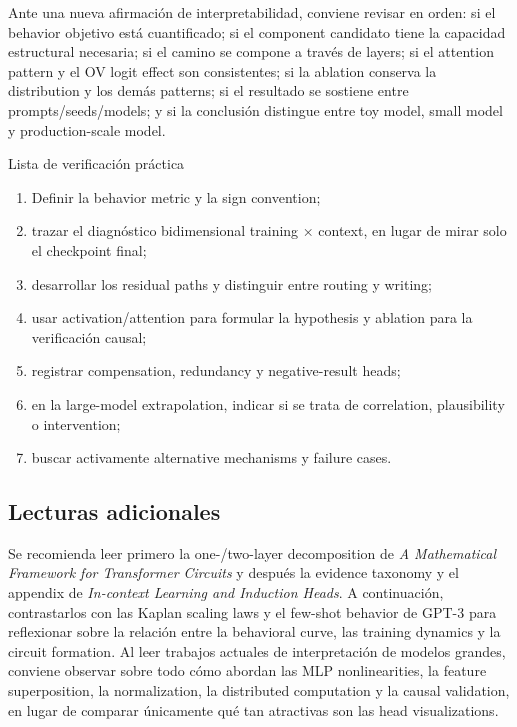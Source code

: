 \documentclass[a4paper]{article}
\begin{document}
Ante una nueva afirmación de interpretabilidad, conviene revisar en orden: si el behavior objetivo está cuantificado; si el component candidato tiene la capacidad estructural necesaria; si el camino se compone a través de layers; si el attention pattern y el OV logit effect son consistentes; si la ablation conserva la distribution y los demás patterns; si el resultado se sostiene entre prompts/seeds/models; y si la conclusión distingue entre toy model, small model y production-scale model.

\begin{knowledgebox}{Lista de verificación práctica}
\begin{enumerate}
  \item Definir la behavior metric y la sign convention;
  \item trazar el diagnóstico bidimensional training × context, en lugar de mirar solo el checkpoint final;
  \item desarrollar los residual paths y distinguir entre routing y writing;
  \item usar activation/attention para formular la hypothesis y ablation para la verificación causal;
  \item registrar compensation, redundancy y negative-result heads;
  \item en la large-model extrapolation, indicar si se trata de correlation, plausibility o intervention;
  \item buscar activamente alternative mechanisms y failure cases.
\end{enumerate}
\end{knowledgebox}

\subsection{Lecturas adicionales}

Se recomienda leer primero la one-/two-layer decomposition de \emph{A Mathematical Framework for Transformer Circuits} y después la evidence taxonomy y el appendix de \emph{In-context Learning and Induction Heads}. A continuación, contrastarlos con las Kaplan scaling laws y el few-shot behavior de GPT-3 para reflexionar sobre la relación entre la behavioral curve, las training dynamics y la circuit formation. Al leer trabajos actuales de interpretación de modelos grandes, conviene observar sobre todo cómo abordan las MLP nonlinearities, la feature superposition, la normalization, la distributed computation y la causal validation, en lugar de comparar únicamente qué tan atractivas son las head visualizations.

\end{document}
